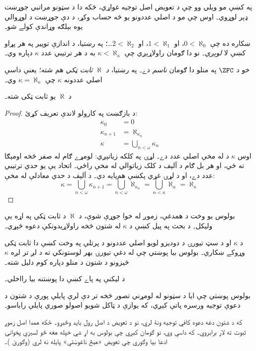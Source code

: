 \documentclass[../../../include/open-logic-section]{subfiles}
\begin{document}

په  کښې مو ويلي وو چې د تعويض اصل توجيه
غواړي، ځکه دا د سټونو مراتبي جوړښت ډېر لوړوي۔ اوس چې مو د اصلي
عددونو يو څه حساب وکړ، د دې جوړښت د لوړوالي يوه بېلګه وړاندې
کولے شو۔

ښکاره ده چې $0 < \aleph_0$، او $1 < \aleph_1$، او
$2 < \aleph_2$\ldots؛ په رښتيا، د اندازې توپير په هر پړاو کښې
لا \emph{لوېږي}۔ نو دا ګومان راولاړېږي چې
$\kappa< \aleph_\kappa$ به د هر ترتيبي عدد $\kappa$ دپاره وي۔

خو د $\ZFC$ په منلو دا ګومان \emph{ناسم} دے۔ په رښتيا،
\emph{د $\aleph$ ثابت ټکي} هم شته؛ يعنې داسې اصلي عددونه
$\kappa$ چې $\kappa=\aleph_\kappa$ وي۔

\begin{prop}
د $\aleph$ يو ثابت ټکی شته۔
\end{prop}

\begin{proof}
د بازګښت په کارولو لاندې تعريف کړئ:
\begin{align*}
	\kappa_0 &= 0\\
	\kappa_{n+1} &= \aleph_{\kappa_n}\\
	\kappa&= \bigcup_{n < \omega}\kappa_n
\end{align*}
اوس $\kappa$ د
 له مخې
اصلي عدد دے۔ لړۍ په کلکه زياتېږي: لومړے ګام له صفر
څخه اومېګا ته ځي، او هر بل ګام د اَلېف د کلک زياتوالي له
مخې راځي۔ اتحاد يې يو حدي ترتيبي عدد دے، او د لړۍ غړي
پکښې هم‌پايه دي۔ د اَلېف د حدي معادلې له مخې:
\[
	\kappa= \bigcup_{n < \omega} \kappa_{n+1} = 
	\bigcup_{n < \omega}\aleph_{\kappa_n} = 
	\bigcup_{\alpha < \kappa}\aleph_\alpha = \aleph_\kappa
\]
\end{proof}

بولوس يو وخت د همدغې، زموږ له خوا جوړې شوې، د $\aleph$
د ثابت ټکي په اړه يې وليکل۔ د بحث په پيل کښې د $\kappa$
له شتون څخه راولاړېدونکې دعوه څېړي۔
\begin{explain}
  د $\kappa$ او د سټ تيورۍ د دوديزو لويو اصلي عددونو د پرتلې په
  وخت کښې دا ثابت ټکی وړوکے ښکاري۔ بولوس بيا پوښتي چې له
  دغې تيورۍ بهر لوستونکي ته د لږ تر لږه $\kappa$ څيزونو
  د شتون د منلو دپاره کوم دليل شته۔ \citep[p.~257]{Boolos2000}
\end{explain}
د ليکنې په پاے کښې دا پوښتنه بيا رااخلي۔
\begin{explain}
  بولوس پوښتي چې ايا د سټونو له لومړني تصور څخه تر دې
  لرې پايلې پورې د شتون د دعوې توجيه ورسره پاتې کېږي، که
  يوازې د ټاکل شويو اصولو صوري پايلې راباسو۔ \citep[p.~268]{Boolos2000}
\end{explain}
که د شتون دغه دعوه کافي توجيه ونۀ لري، نو د تعويض د اصل
رول بايد وڅېړو۔ ځکه همدا اصل زموږ ثبوت ته
لار برابروي۔ که داسې وي، نو ګومان کېږي چې بولوس به اړ شي
خپله هغه څو لسيزې پخوانۍ ادعا بيا وګوري چې تعويض «هېڅ
ناغوښتې» پايله نه لري (وګورئ )۔
\end{document}
